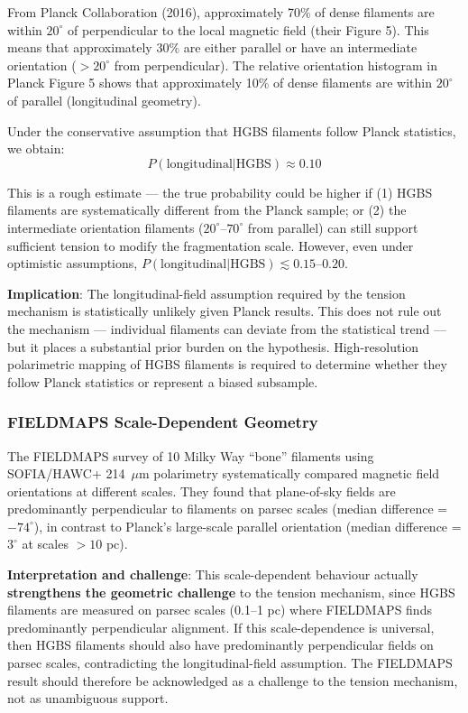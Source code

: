 \documentclass[11pt,a4paper]{article}
\begin{document}
From Planck Collaboration (2016), approximately 70\% of dense filaments are within $20^\circ$ of perpendicular to the local magnetic field (their Figure 5). This means that approximately 30\% are either parallel or have an intermediate orientation ($>20^\circ$ from perpendicular). The relative orientation histogram in Planck Figure 5 shows that approximately 10\% of dense filaments are within $20^\circ$ of parallel (longitudinal geometry).

Under the conservative assumption that HGBS filaments follow Planck statistics, we obtain:
\begin{equation}
P(\text{longitudinal}|\text{HGBS}) \approx 0.10
\end{equation}

This is a rough estimate — the true probability could be higher if (1) HGBS filaments are systematically different from the Planck sample; or (2) the intermediate orientation filaments ($20^\circ$--$70^\circ$ from parallel) can still support sufficient tension to modify the fragmentation scale. However, even under optimistic assumptions, $P(\text{longitudinal}|\text{HGBS}) \lesssim 0.15$--$0.20$.

\textbf{Implication}: The longitudinal-field assumption required by the tension mechanism is statistically unlikely given Planck results. This does not rule out the mechanism — individual filaments can deviate from the statistical trend — but it places a substantial prior burden on the hypothesis. High-resolution polarimetric mapping of HGBS filaments is required to determine whether they follow Planck statistics or represent a biased subsample.

\subsubsection{FIELDMAPS Scale-Dependent Geometry}

The FIELDMAPS survey of 10 Milky Way ``bone'' filaments \citep{Coude2025} using SOFIA/HAWC+ 214~$\mu$m polarimetry systematically compared magnetic field orientations at different scales. They found that plane-of-sky fields are predominantly perpendicular to filaments on parsec scales (median difference = $-74^{\circ}$), in contrast to Planck's large-scale parallel orientation (median difference = $3^{\circ}$ at scales $>10$ pc).

\textbf{Interpretation and challenge}: This scale-dependent behaviour actually \textbf{strengthens the geometric challenge} to the tension mechanism, since HGBS filaments are measured on parsec scales (0.1--1 pc) where FIELDMAPS finds predominantly perpendicular alignment. If this scale-dependence is universal, then HGBS filaments should also have predominantly perpendicular fields on parsec scales, contradicting the longitudinal-field assumption. The FIELDMAPS result should therefore be acknowledged as a challenge to the tension mechanism, not as unambiguous support.
\end{document}
